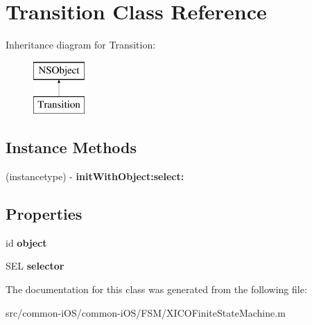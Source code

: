 \hypertarget{interface_transition}{}\section{Transition Class Reference}
\label{interface_transition}
Inheritance diagram for Transition\+:\begin{figure}[H]
\begin{center}
\leavevmode
\includegraphics[height=2.000000cm]{interface_transition}
\end{center}
\end{figure}
\subsection*{Instance Methods}
\begin{DoxyCompactItemize}
\item 
\hypertarget{interface_transition_afe229d96f700fd72877873cec6ecab4c}{}\label{interface_transition_afe229d96f700fd72877873cec6ecab4c} 
(instancetype) -\/ {\bfseries init\+With\+Object\+:select\+:}
\end{DoxyCompactItemize}
\subsection*{Properties}
\begin{DoxyCompactItemize}
\item 
\hypertarget{interface_transition_a0ce8b8e6a85c6b0a26318a0a60caa41b}{}\label{interface_transition_a0ce8b8e6a85c6b0a26318a0a60caa41b} 
id {\bfseries object}
\item 
\hypertarget{interface_transition_a8fbabed762305b7f9d51919413a96c08}{}\label{interface_transition_a8fbabed762305b7f9d51919413a96c08} 
S\+EL {\bfseries selector}
\end{DoxyCompactItemize}


The documentation for this class was generated from the following file\+:\begin{DoxyCompactItemize}
\item 
src/common-\/i\+O\+S/common-\/i\+O\+S/\+F\+S\+M/X\+I\+C\+O\+Finite\+State\+Machine.\+m\end{DoxyCompactItemize}
